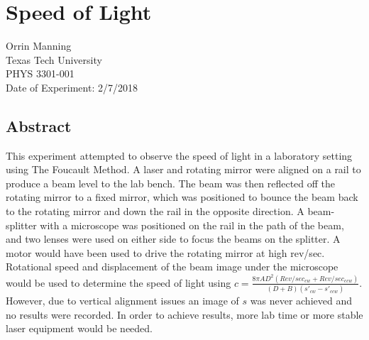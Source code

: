 \documentclass[12pt]{report}
\begin{document}
\section*{Speed of Light}
Orrin Manning\\[10pt]
Texas Tech University\\[10pt]
PHYS 3301-001\\[10pt]
Date of Experiment: 2/7/2018

\subsection*{Abstract}
This experiment attempted to observe the speed of light in a laboratory setting using The Foucault Method. A laser and rotating mirror were aligned on a rail to produce a beam level to the lab bench. The beam was then reflected off the rotating mirror to a fixed mirror, which was positioned to bounce the beam back to the rotating mirror and down the rail in the opposite direction. A beam-splitter with a microscope was positioned on the rail in the path of the beam, and two lenses were used on either side to focus the beams on the splitter. A motor would have been used to drive the rotating mirror at high rev/sec. Rotational speed and displacement of the beam image under the microscope would be used to determine the speed of light using 
$c = \frac{8\pi AD^2(Rev/sec_{cw}+Rev/sec_{ccw})}{(D+B)(s'_{cw}-s'_{ccw})}$.
However, due to vertical alignment issues an image of $s$ was never achieved and no results were recorded. In order to achieve results, more lab time or more stable laser equipment would be needed.
\end{document}
